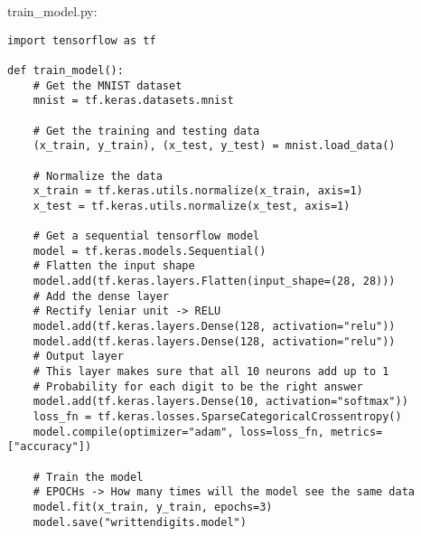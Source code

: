 \documentclass{article}
\begin{document}
\newpage
\begin{flushleft}
train\_model.py:
\end{flushleft}
\begin{verbatim}
import tensorflow as tf

def train_model():
    # Get the MNIST dataset
    mnist = tf.keras.datasets.mnist

    # Get the training and testing data
    (x_train, y_train), (x_test, y_test) = mnist.load_data()

    # Normalize the data
    x_train = tf.keras.utils.normalize(x_train, axis=1)
    x_test = tf.keras.utils.normalize(x_test, axis=1)

    # Get a sequential tensorflow model
    model = tf.keras.models.Sequential()
    # Flatten the input shape
    model.add(tf.keras.layers.Flatten(input_shape=(28, 28)))
    # Add the dense layer
    # Rectify leniar unit -> RELU
    model.add(tf.keras.layers.Dense(128, activation="relu"))
    model.add(tf.keras.layers.Dense(128, activation="relu"))
    # Output layer
    # This layer makes sure that all 10 neurons add up to 1
    # Probability for each digit to be the right answer
    model.add(tf.keras.layers.Dense(10, activation="softmax"))
    loss_fn = tf.keras.losses.SparseCategoricalCrossentropy()
    model.compile(optimizer="adam", loss=loss_fn, metrics=["accuracy"])

    # Train the model
    # EPOCHs -> How many times will the model see the same data
    model.fit(x_train, y_train, epochs=3)
    model.save("writtendigits.model")
\end{verbatim}
\end{document}
